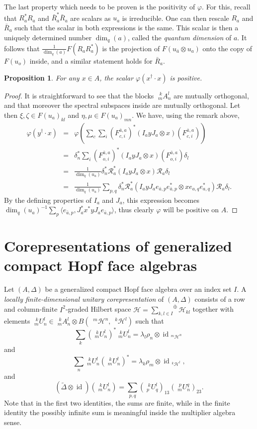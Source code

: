 \documentclass[12pt]{article}
\theoremstyle{change}
\DeclareMathOperator{\id}{id}
\newcommand{\Hsp}{\mathscr{H}}
\newcommand{\Gr}[5]{\;{}^{\;#2}_{#4}#1_{#5}^{#3}}%
\newcommand{\Gru}[3]{\;{}^{\;#2}#1^{#3}}
\newcommand{\osumc}[1]{\underset{#1}{\sum}^{\bar{\oplus}}}
\newcommand{\wDelta}{\widetilde{\Delta}}
\newtheorem{Prop}[Theorem]{Proposition}
\theoremstyle{definition}
\numberwithin{equation}{section}
\begin{document}
The last property which needs to be proven is the positivity of $\varphi$. For this, recall that $R_a^*R_a$ and $\bar{R}_a^*\bar{R}_a$ are scalars as $u_a$ is irreducible. One can then rescale $R_a$ and $\bar{R}_a$ such that the scalar in both expressions is the same. This scalar is then a uniquely determined number $\dim_q(a)$, called the \emph{quantum dimension} of $a$. It follows that $\frac{1}{\dim_q(a)}F(R_aR_a^*)$ is the projection of $F(u_{\bar{a}}\otimes u_a)$ onto the copy of $F(u_o)$ inside, and a similar statement holds for $\bar{R}_a$.

\begin{Prop} For any $x\in A$, the scalar $\varphi(x^{\dagger}\cdot x)$ is positive.
\end{Prop}

\begin{proof} It is straightforward to see that the blocks $\Gr{A}{k}{l}{m}{n}$ are mutually orthogonal, and that moreover the spectral subspaces inside are mutually orthogonal. Let then $\xi,\zeta \in F(u_a)_{kl}$ and $\eta,\mu\in F(u_a)_{mn}$. We have, using the remark above, \begin{eqnarray*} \varphi(y^{\dag}\cdot x) &=& \varphi(\sum_c\sum_i \left(F_{c,i}^{\bar{a},a}\right)^*(I_ayJ_a\otimes x)\left(F_{c,i}^{\bar{a},a}\right))\\ &=& \delta_n^* \sum_i \left(F_{o,i}^{\bar{a},a}\right)^*(I_ayJ_a\otimes x)\left(F_{o,i}^{\bar{a},a}\right)\delta_l\\ &=& \frac{1}{\dim_q(u_a)} \delta_n^* \mathscr{R}_a^*(I_ayJ_a\otimes x)\mathscr{R}_a\delta_l \\ &=& \frac{1}{\dim_q(u_a)}\sum_{p,q}\delta_n^*\mathscr{R}_a^*(I_ayJ_ae_{\bar{a},p}e_{\bar{a},p}^*\otimes xe_{a,q}e_{a,q}^*)\mathscr{R}_a\delta_l.\end{eqnarray*} By the defining properties of $I_a$ and $J_a$, this expression becomes $\dim_q(u_a)^{-1}\sum_{p} \langle e_{\bar{a},p},J_a^*x^*yJ_ae_{\bar{a},p}\rangle$, thus clearly $\varphi$ will be positive on $A$.
\end{proof}

\section*{Corepresentations of generalized compact Hopf face algebras}

Let $(A,\Delta)$ be a generalized compact Hopf face algebra over an index set $I$. A \emph{locally finite-dimensional unitary corepresentation} of $(A,\Delta)$ consists of a row and column-finite $I^2$-graded Hilbert space $\Hsp = \osumc{k,l\in I}\Hsp_{kl}$ together with elements $\Gr{U}{k}{l}{m}{n}\in \Gr{A}{k}{l}{m}{n}\otimes B(\Gru{\Hsp}{m}{n},\Gru{\Hsp}{k}{l})$ such that \[\sum_{k} \left(\Gr{U}{k}{l}{m}{n}\right)^*\Gr{U}{k}{l}{m}{n} = \lambda_l\rho_n \otimes \id_{\Gru{\Hsp}{m}{n}}\] and \[\sum_{n} \Gr{U}{k}{l}{m}{n}\left(\Gr{U}{k}{l}{m}{n}\right)^* = \lambda_k\rho_m \otimes \id_{\Gru{\Hsp}{k}{l}},\] and \[(\wDelta\otimes \id)(\Gr{U}{k}{l}{m}{n}) = \sum_{p,q} \left(\Gr{U}{k}{l}{p}{q}\right)_{13}\left(\Gr{U}{p}{q}{m}{n}\right)_{23}.\] Note that in the first two identities, the sums are finite, while in the finite identity the possibly infinite sum is meaningful inside the multiplier algebra sense.
\end{document}

